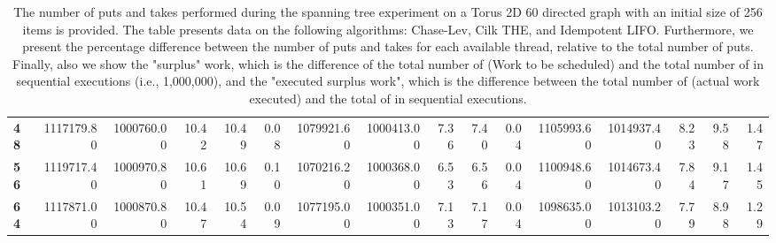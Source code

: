 \begin{table}[!ht]
{\begin{tabular}{lrrrrrrrrrrrrrrr}
\textbf{48} & 1117179.80 & 1000760.00 &          10.42 &       10.49 &                 0.08 & 1079921.60 & 1000413.00 &           7.36 &        7.40 &                 0.04 &      1105993.60 & 1014937.40 &           8.23 &        9.58 &                 1.47 \\
\textbf{56} & 1119717.40 & 1000970.80 &          10.61 &       10.69 &                 0.10 & 1070216.20 & 1000368.00 &           6.53 &        6.56 &                 0.04 &      1100948.60 & 1014673.40 &           7.84 &        9.17 &                 1.45 \\
\textbf{64} & 1117871.00 & 1000870.80 &          10.47 &       10.54 &                 0.09 & 1077195.00 & 1000351.00 &           7.13 &        7.17 &                 0.04 &      1098635.00 & 1013103.20 &           7.79 &        8.98 &                 1.29 \\
\bottomrule
\end{tabular}}
\label{difference-Torus_2D_60_directed-256-CHASELEV-CILK-IDEMPOTENT_LIFO}
\caption{The number of puts and takes performed during the
    spanning tree experiment on a Torus 2D 60 directed graph with an initial size
    of 256 items is provided. The table presents data on the
    following algorithms: Chase-Lev, Cilk THE, and
    Idempotent LIFO. Furthermore, we present the percentage difference
    between the number of puts and takes for each available thread,
    relative to the total number of puts. Finally, also we show the
    "surplus" work, which is the difference of the total number of
    \Puts (Work to be scheduled) and the total number of \Puts in
    sequential executions (i.e., 1,000,000), and the "executed surplus
    work", which is the difference between the total number of \Takes
    (actual work executed) and the total of \Takes in sequential
    executions.}
\end{table}
